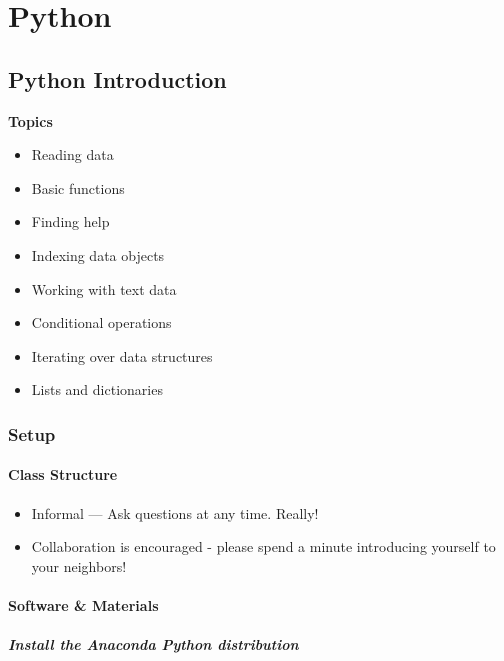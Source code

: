 \documentclass[]{book}
\providecommand{\tightlist}{%
  \setlength{\itemsep}{0pt}\setlength{\parskip}{0pt}}
\begin{document}
\hypertarget{part-python}{%
\part{Python}\label{part-python}}

\hypertarget{python-introduction}{%
\chapter{Python Introduction}\label{python-introduction}}

\textbf{Topics}

\begin{itemize}
\tightlist
\item
  Reading data
\item
  Basic functions
\item
  Finding help
\item
  Indexing data objects
\item
  Working with text data
\item
  Conditional operations
\item
  Iterating over data structures
\item
  Lists and dictionaries
\end{itemize}

\hypertarget{setup-4}{%
\section{Setup}\label{setup-4}}

\hypertarget{class-structure-4}{%
\subsection{Class Structure}\label{class-structure-4}}

\begin{itemize}
\tightlist
\item
  Informal --- Ask questions at any time. Really!
\item
  Collaboration is encouraged - please spend a minute introducing yourself to your neighbors!
\end{itemize}

\hypertarget{software-materials-4}{%
\subsection{Software \& Materials}\label{software-materials-4}}

\hypertarget{install-the-anaconda-python-distribution}{%
\subsubsection{Install the Anaconda Python distribution}\label{install-the-anaconda-python-distribution}}
\end{document}
